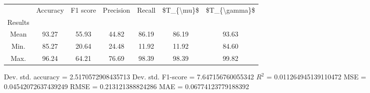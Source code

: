 \begin{tabular}{|c|c|c|c|c|c|c|}
\toprule
{} &  Accuracy &  F1 score &  Precision &  Recall &  \$T\_\{\textbackslash mu\}\$ &  \$T\_\{\textbackslash gamma\}\$ \\
Results &           &           &            &         &            &               \\
\hline
Mean    &     93.27 &     55.93 &      44.82 &   86.19 &      86.19 &         93.63 \\
Min.    &     85.27 &     20.64 &      24.48 &   11.92 &      11.92 &         84.60 \\
Max.    &     96.24 &     64.21 &      76.69 &   98.39 &      98.39 &         99.82 \\
\bottomrule
\end{tabular}

 Dev. std. accuracy = 2.5170572908435713
 Dev. std. F1-score = 7.647156760055342
 $R^2$ = 0.011264945139110472
 MSE = 0.04542072637439249
 RMSE = 0.213121388824286
 MAE = 0.06774123779188392